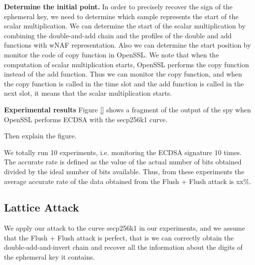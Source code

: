 \noindent\textbf{Determine the initial point.}
In order to precisely recover the sign of the ephemeral key, we need to determine which sample represents the start of the scalar multiplication.
We can determine the
start of the scalar multiplication
by combining the double-and-add chain and the profiles of the double and add functions with wNAF representation.
Also we can determine the start position by monitor the code of copy function in OpenSSL.
 We note that when the computation of scalar multiplication starts, OpenSSL performs the copy function instead of the add function.
 Thus we can monitor the copy function, and when the copy function is called in the time slot and the add function is called in the next slot, it means that the scalar multiplication starts.


\noindent\textbf{Experimental results}
Figure \ref{} shows a fragment of the output of the spy when OpenSSL performs ECDSA with the secp256k1 curve.

Then explain the figure.

We totally run 10 experiments, i.e. monitoring the ECDSA signature 10 times.
The accurate rate is defined as the value of the actual number of bits obtained divided by the ideal number of bits available.
Thus, from these experiments the average accurate rate of the data obtained from the Flush + Flush attack is xx\%.



%
%
%
%
%


\subsection{Lattice Attack}
\label{latticeattack}
We apply our attack to the curve secp256k1 in our experiments, and we assume that the Flush + Flush attack is perfect, that is we can correctly obtain the double-add-and-invert chain and recover all the information about the digits of the ephemeral key it contains.

